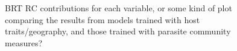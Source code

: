 \documentclass[12pt]{article}
\begin{document}
 \begin{figure}[h!]
  \caption{BRT RC contributions for each variable, or some kind of plot comparing the results from models trained with host traits/geography, and those trained with parasite community measures? }
 \label{fig:b}
 \end{figure}

 \begin{figure}[h!]
  \caption{ }
 \label{fig:c}
 \end{figure}
\end{document}
